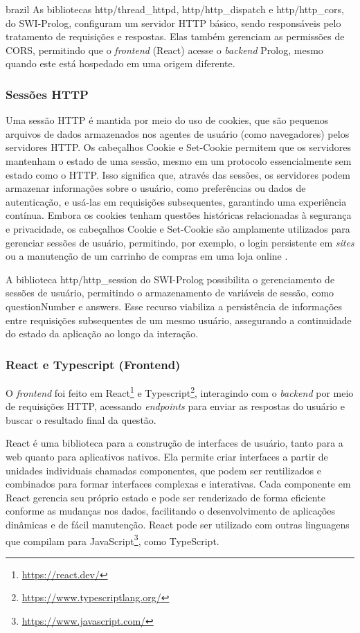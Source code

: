 \begin{otherlanguage*}{brazil}
As bibliotecas http/thread\_httpd, http/http\_dispatch e http/http\_cors, do SWI-Prolog, configuram um servidor HTTP básico, sendo responsáveis pelo tratamento de requisições e respostas. Elas também gerenciam as permissões de CORS, permitindo que o \textit{frontend} (React) acesse o \textit{backend} Prolog, mesmo quando este está hospedado em uma origem diferente.

\subsubsection{Sessões HTTP}

Uma sessão HTTP é mantida por meio do uso de cookies, que são pequenos arquivos de dados armazenados nos agentes de usuário (como navegadores) pelos servidores HTTP. Os cabeçalhos Cookie e Set-Cookie permitem que os servidores mantenham o estado de uma sessão, mesmo em um protocolo essencialmente sem estado como o HTTP. Isso significa que, através das sessões, os servidores podem armazenar informações sobre o usuário, como preferências ou dados de autenticação, e usá-las em requisições subsequentes, garantindo uma experiência contínua. Embora os cookies tenham questões históricas relacionadas à segurança e privacidade, os cabeçalhos Cookie e Set-Cookie são amplamente utilizados para gerenciar sessões de usuário, permitindo, por exemplo, o login persistente em \textit{sites} ou a manutenção de um carrinho de compras em uma loja online \cite{whatissession}.

A biblioteca http/http\_session do SWI-Prolog possibilita o gerenciamento de sessões de usuário, permitindo o armazenamento de variáveis de sessão, como questionNumber e answers. Esse recurso viabiliza a persistência de informações entre requisições subsequentes de um mesmo usuário, assegurando a continuidade do estado da aplicação ao longo da interação.

\subsubsection{React e Typescript (Frontend)}

O \textit{frontend} foi feito em React\footnote{\url{https://react.dev/}} e Typescript\footnote{\url{https://www.typescriptlang.org/}}, interagindo com o \textit{backend} por meio de requisições HTTP, acessando \textit{endpoints} para enviar as respostas do usuário e buscar o resultado final da questão.

React é uma biblioteca para a construção de interfaces de usuário, tanto para a web quanto para aplicativos nativos. Ela permite criar interfaces a partir de unidades individuais chamadas componentes, que podem ser reutilizados e combinados para formar interfaces complexas e interativas. Cada componente em React gerencia seu próprio estado e pode ser renderizado de forma eficiente conforme as mudanças nos dados, facilitando o desenvolvimento de aplicações dinâmicas e de fácil manutenção. React pode ser utilizado com outras linguagens que compilam para JavaScript\footnote{\url{https://www.javascript.com/}}, como TypeScript.


\end{otherlanguage*}
